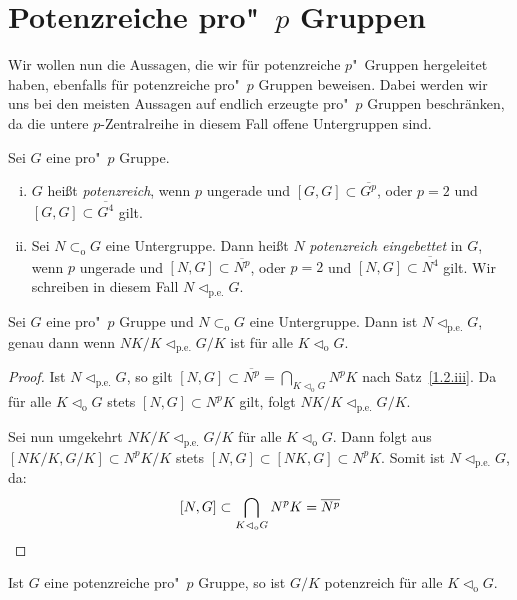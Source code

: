 \documentclass[11pt,a4paper,openany]{memoir}
\begin{document}
\section{Potenzreiche pro"~$p$ Gruppen}

Wir wollen nun die Aussagen, die wir für potenzreiche $p$"~Gruppen hergeleitet haben, ebenfalls für potenzreiche pro"~$p$ Gruppen beweisen. Dabei werden wir uns bei den meisten Aussagen auf endlich erzeugte pro"~$p$ Gruppen beschränken, da die untere $p$-Zentralreihe in diesem Fall offene Untergruppen sind.

\begin{definition}
Sei $G$ eine pro"~$p$ Gruppe.
\begin{enumerate}[(i)]
\item $G$ heißt \textit{potenzreich}, wenn $p$ ungerade und $[G,G]\subset \overline{G^p}$, oder $p=2$ und $[G,G]\subset \overline{G^4}$ gilt.
\item Sei $N\subset_\text{o} G$ eine Untergruppe. Dann heißt $N$ \textit{potenzreich eingebettet} in $G$, wenn $p$ ungerade und $[N,G]\subset \overline{N^p}$, oder $p=2$ und $[N,G]\subset \overline{N^4}$ gilt. Wir schreiben in diesem Fall $N\lhd_\text{p.e.}G$.
\end{enumerate}
\end{definition}

\begin{proposition}\label{3.2}
Sei $G$ eine pro"~$p$ Gruppe und $N\subset_\text{o}G$ eine Untergruppe. Dann ist $N\lhd_\text{p.e.}G$, genau dann wenn $NK/K\lhd_\text{p.e.} G/K$ ist für alle $K\lhd_\text{o}G$. 
\end{proposition}

\begin{proof}
Ist $N\lhd_\text{p.e.}G$, so gilt $[N,G]\subset\overline{N^p}=\bigcap_{K\lhd_\text{o}G}N^pK$ nach Satz~\ref{1.2.iii}. Da für alle $K\lhd_\text{o}G$ stets $[N,G]\subset N^pK$ gilt, folgt $NK/K\lhd_\text{p.e.}G/K$.

Sei nun umgekehrt $NK/K\lhd_\text{p.e.}G/K$ für alle $K\lhd_\text{o}G$. Dann folgt aus $[NK/K,G/K]\subset N^pK/K$ stets $[N,G]\subset [NK,G]\subset N^pK$. Somit ist $N\lhd_\text{p.e.}G$, da:
\[[N,G]\subset\bigcap_{K\lhd_\text{o}G}N^pK=\overline{N^p}\qedhere \]
\end{proof}

\begin{remark}
Ist $G$ eine potenzreiche pro"~$p$ Gruppe, so ist $G/K$ potenzreich für alle $K\lhd_\text{o}G$.
\end{remark}
\end{document}
